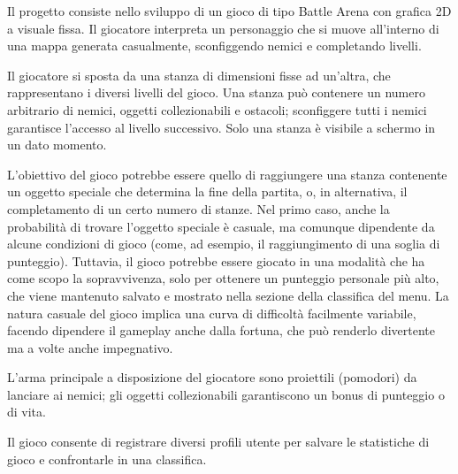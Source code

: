 Il progetto consiste nello sviluppo di un gioco di tipo Battle Arena con grafica 2D a visuale fissa. Il giocatore interpreta un personaggio che si muove all'interno di una mappa generata casualmente, sconfiggendo nemici e completando livelli.

Il giocatore si sposta da una stanza di dimensioni fisse ad un'altra, che rappresentano i diversi livelli del gioco.
Una stanza può contenere un numero arbitrario di nemici, oggetti collezionabili e ostacoli; sconfiggere tutti i nemici garantisce l'accesso al livello successivo. Solo una stanza è visibile a schermo in un dato momento.

L'obiettivo del gioco potrebbe essere quello di raggiungere una stanza contenente un oggetto speciale che determina la fine della partita, o, in alternativa, il completamento di un certo numero di stanze.
Nel primo caso, anche la probabilità di trovare l'oggetto speciale è casuale, ma comunque dipendente da alcune condizioni di gioco (come, ad esempio, il raggiungimento di una soglia di punteggio).
Tuttavia, il gioco potrebbe essere giocato in una modalità che ha come scopo la sopravvivenza, solo per ottenere un punteggio personale più alto, che viene mantenuto salvato e mostrato nella sezione della classifica del menu.
La natura casuale del gioco implica una curva di difficoltà facilmente variabile, facendo dipendere il gameplay anche dalla fortuna, che può renderlo divertente ma a volte anche impegnativo.

L'arma principale a disposizione del giocatore sono proiettili (pomodori) da lanciare ai nemici; gli oggetti collezionabili garantiscono un bonus di punteggio o di vita.

Il gioco consente di registrare diversi profili utente per salvare le statistiche di gioco e confrontarle in una classifica.